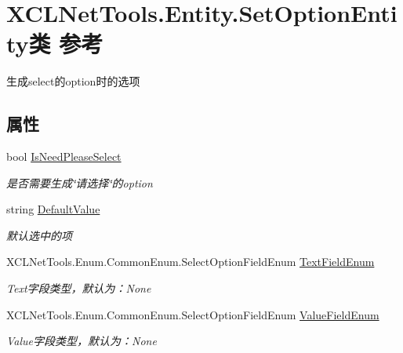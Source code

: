 \hypertarget{class_x_c_l_net_tools_1_1_entity_1_1_set_option_entity}{}\section{X\+C\+L\+Net\+Tools.\+Entity.\+Set\+Option\+Entity类 参考}
\label{class_x_c_l_net_tools_1_1_entity_1_1_set_option_entity}


生成select的option时的选项  


\subsection*{属性}
\begin{DoxyCompactItemize}
\item 
bool \hyperlink{class_x_c_l_net_tools_1_1_entity_1_1_set_option_entity_a22c7d14f09183bb9124fa9219663be6c}{Is\+Need\+Please\+Select}
\begin{DoxyCompactList}\small\item\em 是否需要生成\char`\"{}请选择\char`\"{}的option \end{DoxyCompactList}\item 
string \hyperlink{class_x_c_l_net_tools_1_1_entity_1_1_set_option_entity_a504fe6ad96f52cb7eb9f8a4e64e07723}{Default\+Value}
\begin{DoxyCompactList}\small\item\em 默认选中的项 \end{DoxyCompactList}\item 
X\+C\+L\+Net\+Tools.\+Enum.\+Common\+Enum.\+Select\+Option\+Field\+Enum \hyperlink{class_x_c_l_net_tools_1_1_entity_1_1_set_option_entity_a73ab171debc846e282a87565cf7baf96}{Text\+Field\+Enum}
\begin{DoxyCompactList}\small\item\em Text字段类型，默认为：\+None \end{DoxyCompactList}\item 
X\+C\+L\+Net\+Tools.\+Enum.\+Common\+Enum.\+Select\+Option\+Field\+Enum \hyperlink{class_x_c_l_net_tools_1_1_entity_1_1_set_option_entity_a3f5eebe69ef0bc0e2c184f9d8d65fbaf}{Value\+Field\+Enum}
\begin{DoxyCompactList}\small\item\em Value字段类型，默认为：\+None \end{DoxyCompactList}\end{DoxyCompactItemize}


